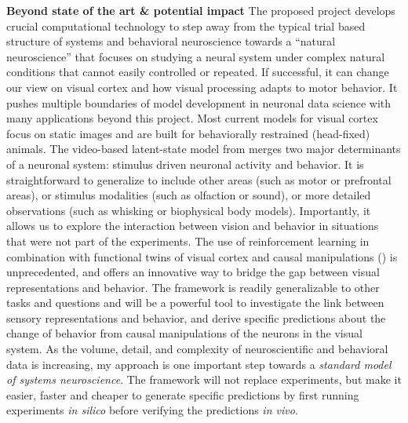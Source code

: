 \documentclass[B2,COG]{ercgrant}
\begin{document}
\textbf{Beyond state of the art \& potential impact} 
The proposed project develops crucial computational technology to step away from the typical trial based structure of systems and behavioral neuroscience towards a ``natural neuroscience'' that focuses on studying a neural system under complex natural conditions that cannot easily controlled or repeated. 
If successful, it can change our view on visual cortex and how visual processing adapts to motor behavior. 
It pushes multiple boundaries of model development in neuronal data science with many applications beyond this project.  Most current models for visual cortex focus on static images and are built for behaviorally restrained (head-fixed) animals. The video-based latent-state model from  merges two major determinants of a neuronal system: stimulus driven neuronal activity and behavior.
It is straightforward to generalize to include other areas (such as motor or prefrontal areas), or stimulus modalities (such as olfaction or sound), or more detailed observations (such as whisking or biophysical body models). 
Importantly, it allows us to explore the interaction between vision and behavior in situations that were not part of the experiments.
 The use of reinforcement learning in combination with functional twins of visual cortex and causal manipulations () is unprecedented, and offers an innovative way to bridge the gap between visual representations and behavior. The framework is readily generalizable to other tasks and questions and will be a powerful tool to investigate the link between sensory representations and behavior, and derive specific predictions about the change of behavior from causal manipulations of the neurons in the visual system.
 As the volume, detail, and complexity of neuroscientific and behavioral data is increasing, my approach is one important step towards a \textit{standard model of systems neuroscience}.
The framework will not replace experiments, but make it easier, faster and cheaper to generate specific predictions by first running experiments \textit{in silico} before verifying the predictions \textit{in vivo}.
\end{document}
